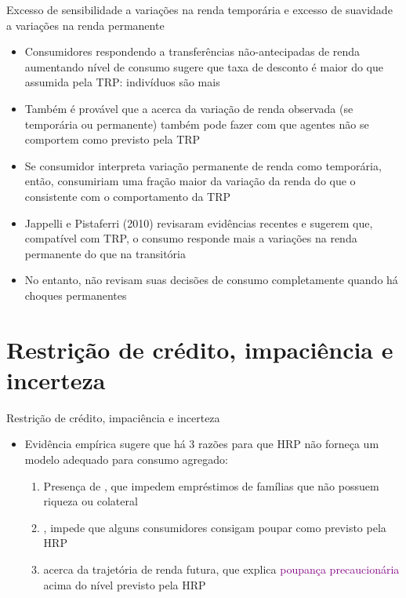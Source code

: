\documentclass[10pt]{beamer}
\begin{document}
\begin{frame}
    {Excesso de sensibilidade a variações na renda temporária e excesso de suavidade a variações na renda permanente}
    \begin{itemize}
        \item Consumidores respondendo a transferências não-antecipadas de renda aumentando nível de consumo sugere que taxa de desconto é maior do que assumida pela TRP: indivíduos são mais \bigskip
        \item Também é provável que a  acerca da variação de renda observada (se temporária ou permanente) também pode fazer com que agentes não se comportem como previsto pela TRP\bigskip
        \item Se consumidor interpreta variação permanente de renda como temporária, então, consumiriam uma fração maior da variação da renda do que o consistente com o comportamento da TRP\bigskip
        \item Jappelli e Pistaferri (2010) revisaram evidências recentes e sugerem que, compatível com TRP, o consumo responde mais a variações na renda permanente do que na transitória\bigskip
        \item No entanto, não revisam suas decisões de consumo completamente quando há choques permanentes
    \end{itemize}
\end{frame}

\section{Restrição de crédito, impaciência e incerteza}
\begin{frame}
    {Restrição de crédito, impaciência e incerteza}
    \begin{itemize}
        \item Evidência empírica sugere que há 3 razões para que HRP não forneça um modelo adequado para consumo agregado:\bigskip
        \begin{enumerate}
            \item Presença de , que impedem empréstimos de famílias que não possuem riqueza ou colateral\medskip
            \item {}, impede que alguns consumidores consigam poupar como previsto pela HRP\medskip
            \item {} acerca da trajetória de renda futura, que explica \textcolor{purple}{poupança precaucionária} acima do nível previsto pela HRP
        \end{enumerate}
    \end{itemize}
\end{frame}
\end{document}
